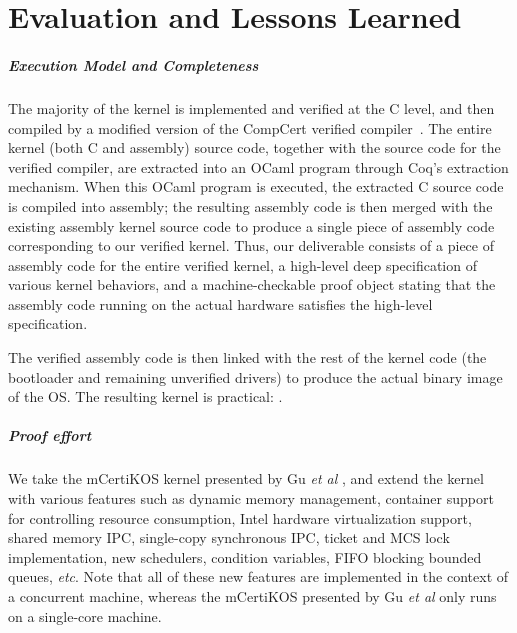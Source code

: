 
\chapter{Evaluation and Lessons Learned}
\label{chap-eval}

\paragraph{Execution Model and Completeness}
The majority of the {\mCTOS} kernel is implemented and verified 
at the C level, and then compiled by a modified version of the CompCert verified
compiler~\cite{dscal15}.  The entire kernel (both C and assembly)
source code, together with the source code for the verified compiler,
are extracted into an OCaml program through Coq's extraction
mechanism. When this OCaml program is executed, the extracted C source code 
is compiled into assembly; the resulting assembly code is then merged 
with the existing assembly kernel source code to produce a single piece 
of assembly code corresponding to our verified kernel.  Thus, our deliverable 
consists of a piece of assembly code for the entire verified kernel, a 
high-level deep specification of various kernel behaviors, and a 
machine-checkable proof object stating that the assembly code running on 
the actual hardware satisfies the high-level specification.

The verified assembly code is then linked with the rest of the kernel code
(the bootloader and remaining unverified drivers) to produce the
actual binary image of the OS. The resulting kernel is practical: .

\paragraph{Proof effort}
We take the mCertiKOS kernel presented by Gu {\it et al}
\cite{dscal15}, and extend the kernel with various features such as
dynamic memory management, container support for controlling resource
consumption, Intel hardware virtualization support, shared memory IPC,
single-copy synchronous IPC, ticket and MCS lock implementation, new
schedulers, condition variables, FIFO blocking bounded queues, {\it
  etc}. Note that all of these new features are implemented in the
context of a concurrent machine, whereas the mCertiKOS presented by Gu
{\it et al} \cite{dscal15} only runs on a single-core machine. 


